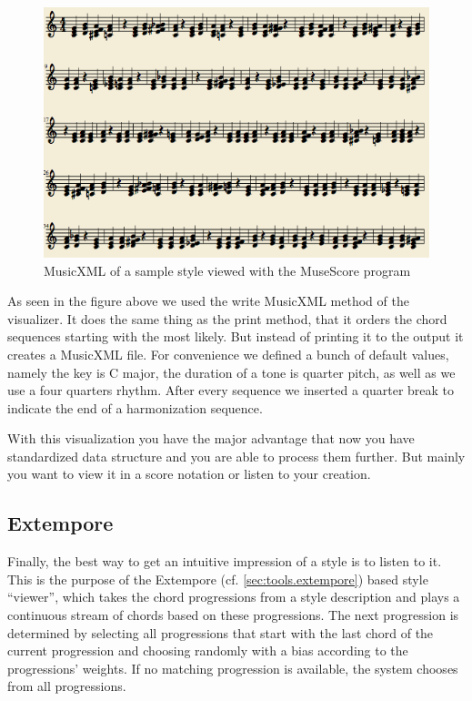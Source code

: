 \begin{figure}[ht]
\includegraphics[scale=.5]{Chapters/pic/xml_print.png}
\caption{MusicXML of a sample style viewed with the MuseScore program}
\end{figure}

As seen in the figure above we used the write MusicXML method of the visualizer. It does the same thing as the print method, that it orders the chord sequences starting with the most likely. But instead of printing it to the output it creates a MusicXML file. For convenience we defined a bunch of default values, namely the key is C major, the duration of a tone is quarter pitch, as well as we use a four quarters rhythm. After every sequence we inserted a quarter break to indicate the end of a harmonization sequence.

With this visualization you have the major advantage that now you have standardized data structure and you are able to process them further. But mainly you want to view it in a score notation or listen to your creation.

\subsection{Extempore}
\label{sec:viewers.extempore}

Finally, the best way to get an intuitive impression of a style is to listen to it.
This is the purpose of the Extempore (cf. \ref{sec:tools.extempore}) based style ``viewer'', which takes the chord progressions from a style description and plays a continuous stream of chords based on these progressions.
The next progression is determined by selecting all progressions that start with the last chord of the current progression and choosing randomly with a bias according to the progressions' weights.
If no matching progression is available, the system chooses from all progressions.

